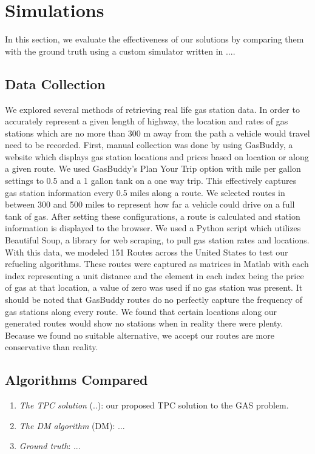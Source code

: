 \documentclass[conference]{IEEEtran}
\theoremstyle{definition}
\begin{document}
\section{Simulations} \label{simulations}
In this section, we evaluate the effectiveness of our solutions by comparing them with the ground truth using a custom simulator written in ....

\subsection{Data Collection}
We explored several methods of retrieving real life gas station data. In order to accurately represent a given length of highway, the location and rates of gas stations which are no more than 300 m away from the path a vehicle would travel need to be recorded. First, manual collection was done by using GasBuddy, a website which displays gas station locations and prices based on location or along a given route. We used GasBuddy’s Plan Your Trip option with mile per gallon settings to 0.5 and a 1 gallon tank on a one way trip. This effectively captures gas station information every 0.5 miles along a route. We selected routes in between 300 and 500 miles to represent how far a vehicle could drive on a full tank of gas. After setting these configurations, a route is calculated and station information is displayed to the browser. We used a Python script which utilizes Beautiful Soup, a library for web scraping, to pull gas station rates and locations. With this data, we modeled 151 Routes across the United States to test our refueling algorithms. These routes were captured as matrices in Matlab with each index representing a unit distance and the element in each index being the price of gas at that location, a value of zero was used if no gas station was present. It should be noted that GasBuddy routes do no perfectly capture the frequency of gas stations along every route. We found that certain locations along our generated routes would show no stations when in reality there were plenty. Because we found no suitable alternative, we accept our routes are more conservative than reality.

\subsection{Algorithms Compared}
\begin{enumerate}
\item {\em The TPC solution} (..): our proposed TPC solution to the GAS problem.
\item {\em The DM algorithm} (DM):  ...
\item {\em Ground truth}: ...
\end{enumerate}
\end{document}
